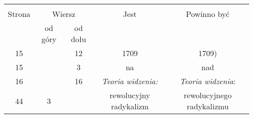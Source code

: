 \documentclass[a4paper,11pt]{article}
\begin{document}
\begin{center}
  \begin{tabular}{|c|c|c|c|c|}
    \hline
    & \multicolumn{2}{c|}{} & & \\
    Strona & \multicolumn{2}{c|}{Wiersz} & Jest
                              & Powinno być \\ \cline{2-3}
    & od góry & od dołu & & \\
    \hline
    15  & & 12 & 1709 & 1709) \\
    15  & &  3 & na & nad \\
    16  & & 16 & \emph{Teoria widzenia:} & \emph{Teoria widzenia}: \\
    44  &  3 & & rewolucyjny radykalizm & rewolucyjnego radykalizmu \\
    \hline
  \end{tabular}
\end{center}

\vspace{\spaceTwo}




 {}



\end{document}
